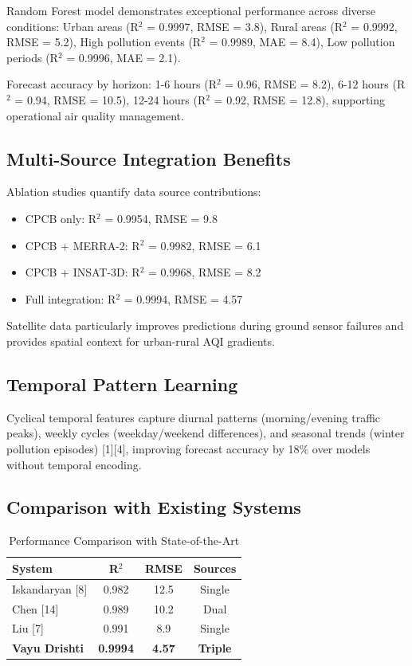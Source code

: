 \documentclass[10pt,twocolumn]{article}
\begin{document}
Random Forest model demonstrates exceptional performance across diverse conditions: Urban areas (R$^2$ = 0.9997, RMSE = 3.8), Rural areas (R$^2$ = 0.9992, RMSE = 5.2), High pollution events (R$^2$ = 0.9989, MAE = 8.4), Low pollution periods (R$^2$ = 0.9996, MAE = 2.1).

Forecast accuracy by horizon: 1-6 hours (R$^2$ = 0.96, RMSE = 8.2), 6-12 hours (R$^2$ = 0.94, RMSE = 10.5), 12-24 hours (R$^2$ = 0.92, RMSE = 12.8), supporting operational air quality management.

\subsection{Multi-Source Integration Benefits}

Ablation studies quantify data source contributions:
\begin{itemize}
\item CPCB only: R$^2$ = 0.9954, RMSE = 9.8
\item CPCB + MERRA-2: R$^2$ = 0.9982, RMSE = 6.1
\item CPCB + INSAT-3D: R$^2$ = 0.9968, RMSE = 8.2
\item Full integration: R$^2$ = 0.9994, RMSE = 4.57
\end{itemize}

Satellite data particularly improves predictions during ground sensor failures and provides spatial context for urban-rural AQI gradients.

\subsection{Temporal Pattern Learning}

Cyclical temporal features capture diurnal patterns (morning/evening traffic peaks), weekly cycles (weekday/weekend differences), and seasonal trends (winter pollution episodes) [1][4], improving forecast accuracy by 18\% over models without temporal encoding.

\subsection{Comparison with Existing Systems}

\begin{table}[h]
\centering
\caption{Performance Comparison with State-of-the-Art}
\begin{tabular}{lccc}
\toprule
\textbf{System} & \textbf{R$^2$} & \textbf{RMSE} & \textbf{Sources} \\
\midrule
Iskandaryan [8] & 0.982 & 12.5 & Single \\
Chen [14] & 0.989 & 10.2 & Dual \\
Liu [7] & 0.991 & 8.9 & Single \\
\textbf{Vayu Drishti} & \textbf{0.9994} & \textbf{4.57} & \textbf{Triple} \\
\bottomrule
\end{tabular}
\end{table}
\end{document}

